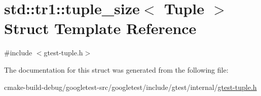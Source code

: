 \hypertarget{structstd_1_1tr1_1_1tuple__size}{}\section{std\+::tr1\+::tuple\+\_\+size$<$ Tuple $>$ Struct Template Reference}
\label{structstd_1_1tr1_1_1tuple__size}


{\ttfamily \#include $<$gtest-\/tuple.\+h$>$}



The documentation for this struct was generated from the following file\+:\begin{DoxyCompactItemize}
\item 
cmake-\/build-\/debug/googletest-\/src/googletest/include/gtest/internal/\mbox{\hyperlink{gtest-tuple_8h}{gtest-\/tuple.\+h}}\end{DoxyCompactItemize}

